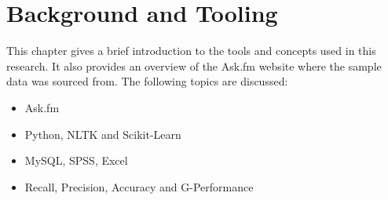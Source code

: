 
\chapter{Background and Tooling} %

\label{chapter2} %


This chapter gives a brief introduction to the tools and concepts used in this research. It also provides an overview of the Ask.fm website where the sample data was sourced from. The following topics are discussed:

\begin{itemize}
	\item  Ask.fm
	\item  Python, NLTK and Scikit-Learn
	\item  MySQL, SPSS, Excel
	\item  Recall, Precision, Accuracy and G-Performance
\end{itemize}

